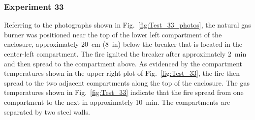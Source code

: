 \clearpage

\subsubsection{Experiment 33}

Referring to the photographs shown in Fig.~\ref{fig:Test_33_photos}, the natural gas burner was positioned near the top of the lower left compartment of the enclosure, approximately 20~cm (8~in) below the breaker that is located in the center-left compartment. The fire ignited the breaker after approximately 2~min and then spread to the compartment above. As evidenced by the compartment temperatures shown in the upper right plot of Fig.~\ref{fig:Test_33}, the fire then spread to the two adjacent compartments along the top of the enclosure. The gas temperatures shown in Fig.~\ref{fig:Test_33} indicate that the fire spread from one compartment to the next in approximately 10~min. The compartments are separated by two steel walls.

